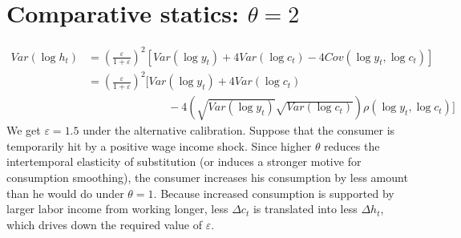 \documentclass[12pt]{amsart}
\begin{document}
\section{Comparative statics: $\theta = 2$}
\begin{align*}
Var(\log h_t) & = \left( \frac{\varepsilon}{1+ \varepsilon}\right)^2 \left[ Var(\log y_t) +  4 Var(\log c_t) - 4 Cov(\log y_t, \log c_t) \right] \\
& = \left( \frac{\varepsilon}{1+ \varepsilon}\right)^2 \Bigg[ Var(\log y_t) + 4 Var(\log c_t) \\
& \hspace{3cm} - 4 \left( \sqrt{Var(\log y_t)} \sqrt{Var(\log c_t)} \right)\rho(\log y_t, \log c_t) \Bigg]
\end{align*}
We get $\varepsilon = 1.5$ under the alternative calibration. Suppose that the consumer is temporarily hit by a positive wage income shock. Since higher $\theta$ reduces the intertemporal elasticity of substitution (or induces a stronger motive for consumption smoothing), the consumer increases his consumption by less amount than he would do under $\theta=1$.  Because increased consumption is supported by larger labor income from working longer, less $\Delta c_t$ is translated into less $\Delta h_t$, which drives down the required value of $\varepsilon$. 
\end{document}

